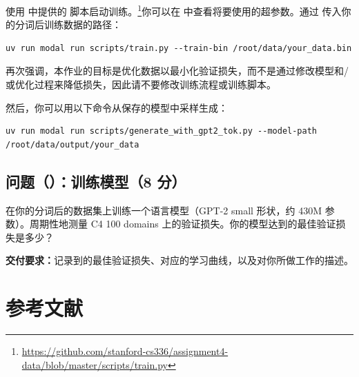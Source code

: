使用  中提供的  脚本启动训练。\footnote{\url{https://github.com/stanford-cs336/assignment4-data/blob/master/scripts/train.py}}你可以在  中查看将要使用的超参数。通过  传入你的分词后训练数据的路径：

\begin{lstlisting}
uv run modal run scripts/train.py --train-bin /root/data/your_data.bin
\end{lstlisting}

再次强调，本作业的目标是优化数据以最小化验证损失，而不是通过修改模型和/或优化过程来降低损失，因此请不要修改训练流程或训练脚本。

然后，你可以用以下命令从保存的模型中采样生成：

\begin{lstlisting}
uv run modal run scripts/generate_with_gpt2_tok.py --model-path /root/data/output/your_data
\end{lstlisting}

\subsection*{问题（）：训练模型（8 分）}

在你的分词后的数据集上训练一个语言模型（GPT-2 small 形状，约 430M 参数）。周期性地测量 C4 100 domains 上的验证损失。你的模型达到的最佳验证损失是多少？

\textbf{交付要求：}记录到的最佳验证损失、对应的学习曲线，以及对你所做工作的描述。

\section*{参考文献}

